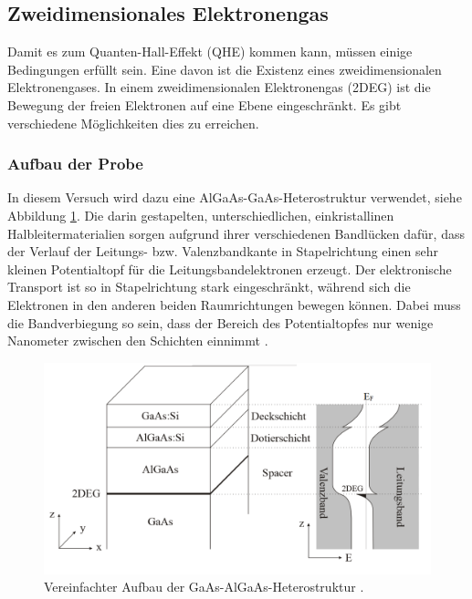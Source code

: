 
\subsection{Zweidimensionales Elektronengas}

Damit es zum Quanten-Hall-Effekt (QHE) kommen kann, müssen einige Bedingungen erfüllt sein. Eine davon ist die Existenz eines zweidimensionalen Elektronengases.
In einem zweidimensionalen Elektronengas (2DEG) ist die Bewegung der freien Elektronen auf eine Ebene eingeschränkt. Es gibt verschiedene Möglichkeiten dies zu erreichen. 
\subsubsection{Aufbau der Probe}
In diesem Versuch wird dazu eine AlGaAs-GaAs-Heterostruktur verwendet, siehe Abbildung \ref{fig:Proben_Aufbau}. Die darin gestapelten, unterschiedlichen, einkristallinen Halbleitermaterialien sorgen aufgrund ihrer verschiedenen Bandlücken dafür, dass der Verlauf der Leitungs- bzw. Valenzbandkante in Stapelrichtung einen sehr kleinen Potentialtopf für die Leitungsbandelektronen erzeugt. Der elektronische Transport ist so in Stapelrichtung stark eingeschränkt, während sich die Elektronen in den anderen beiden Raumrichtungen bewegen können. Dabei muss die Bandverbiegung so sein, dass der Bereich des Potentialtopfes nur wenige Nanometer zwischen den Schichten einnimmt  \cite[Kap.8 a]{weisbuch_quantum_1991}.


\begin{figure}[h]
	\centering
	\includegraphics[width=0.7\linewidth]{images/Anleitungsheft/2DEG_Anleitungsheft.png}
	\caption[2DEG Schicht]{
		Vereinfachter Aufbau der GaAs-AlGaAs-Heterostruktur \cite{anleitung}.
	}
	\label{fig:Proben_Aufbau}
\end{figure}

